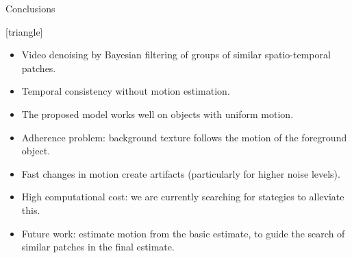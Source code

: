 \documentclass[mathserif, 8pt]{beamer}
\begin{document}
\begin{frame}{Conclusions}

	[triangle]

	\begin{itemize}\itemsep=.5cm
		\item Video denoising by Bayesian filtering of groups of similar spatio-temporal patches.
		\item Temporal consistency without motion estimation.
		\item The proposed model works well on objects with uniform motion.
				\item Adherence problem: background texture follows the motion of the foreground object.
				\item Fast changes in motion create artifacts (particularly for
					higher noise levels). 
				\item High computational cost: we are currently searching for stategies to alleviate this.
		\item Future work: estimate motion from the basic estimate, to guide the search of similar patches 
			in the final estimate.
	\end{itemize}


\end{frame}
\end{document}
